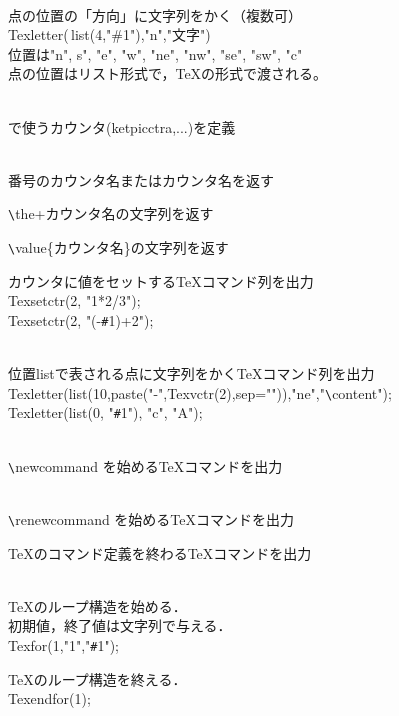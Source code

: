 \documentclass[papersize,a4paper,12pt,uplatex]{jsarticle}
\begin{document}
\\
\tab{}点の位置の「方向」に文字列をかく（複数可）\\
\rei Texletter(\,list(4,"\#1"),"n","文字")\\
\chuu 位置は"n", s", "e", "w", "ne", "nw", "se", "sw", "c"\\
\chuu 点の位置はリスト形式で，\TeX の形式で渡される。

\\
\tab{}\ketpic で使うカウンタ(ketpicctra,...)を定義

\\
\tab{}番号のカウンタ名またはカウンタ名を返す

 \verb|\|the+カウンタ名の文字列を返す

 \verb|\|value\{カウンタ名\}の文字列を返す

カウンタに値をセットする\TeX コマンド列を出力\\
\rei Texsetctr(2, "1*2/3");\\
\rei Texsetctr(2, "(-\verb|#|1)+2");

\\
\tab{}位置listで表される点に文字列をかく\TeX コマンド列を出力\\
\rei Texletter(list(10,paste("-",Texvctr(2),sep="")),"ne","\verb|\|content");\\
\rei Texletter(list(0, "\verb|#|1"), "c", "A");

\\
\tab{}\verb|\|newcommand を始める\TeX コマンドを出力

\\
\tab{}\verb|\|renewcommand を始める\TeX コマンドを出力

\TeX のコマンド定義を終わる\TeX コマンドを出力

\\
\tab{}\TeX のループ構造を始める．\\
\chuu   初期値，終了値は文字列で与える．\\
\rei Texfor(1,"1","\verb|#|1");

\TeX のループ構造を終える．\\
\rei Texendfor(1);
\end{document}
